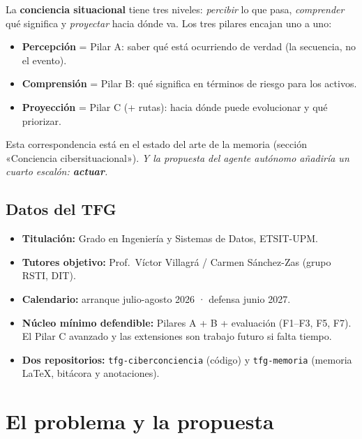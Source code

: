 \documentclass[11pt,a4paper]{article}
\newcommand{\cod}[1]{\texttt{#1}}
\begin{document}
\begin{clave}
La \textbf{conciencia situacional} tiene tres niveles: \textit{percibir} lo que pasa,
\textit{comprender} qué significa y \textit{proyectar} hacia dónde va. Los tres pilares encajan uno a uno:
\begin{itemize}
  \item \textbf{Percepción} = Pilar A: saber qué está ocurriendo de verdad (la secuencia, no el evento).
  \item \textbf{Comprensión} = Pilar B: qué significa en términos de riesgo para los activos.
  \item \textbf{Proyección} = Pilar C (+ rutas): hacia dónde puede evolucionar y qué priorizar.
\end{itemize}
Esta correspondencia está en el estado del arte de la memoria (sección «Conciencia cibersituacional»).
\textit{Y la propuesta del agente autónomo añadiría un cuarto escalón: \textbf{actuar}.}
\end{clave}

\subsection*{Datos del TFG}
\begin{itemize}
  \item \textbf{Titulación:} Grado en Ingeniería y Sistemas de Datos, ETSIT-UPM.
  \item \textbf{Tutores objetivo:} Prof.\ Víctor Villagrá / Carmen Sánchez-Zas (grupo RSTI, DIT).
  \item \textbf{Calendario:} arranque julio-agosto 2026 · defensa junio 2027.
  \item \textbf{Núcleo mínimo defendible:} Pilares A + B + evaluación (F1–F3, F5, F7).
        El Pilar C avanzado y las extensiones son trabajo futuro si falta tiempo.
  \item \textbf{Dos repositorios:} \cod{tfg-ciberconciencia} (código) y \cod{tfg-memoria}
        (memoria \LaTeX, bitácora y anotaciones).
\end{itemize}

\newpage
\section{El problema y la propuesta}\label{sec:problema}
\end{document}
